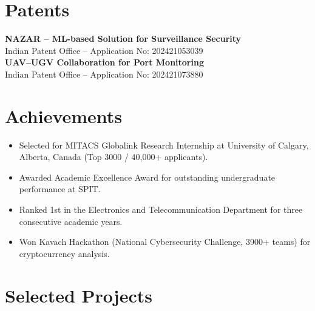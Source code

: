 \documentclass[a4paper,10pt]{article}
\begin{document}
\section*{Patents}
\textbf{NAZAR – ML-based Solution for Surveillance Security}\\
Indian Patent Office – Application No: 202421053039\\[0.2em]
\textbf{UAV–UGV Collaboration for Port Monitoring}\\
Indian Patent Office – Application No: 202421073880


\section*{Achievements}
\begin{itemize}
    \item Selected for MITACS Globalink Research Internship at University of Calgary, Alberta, Canada (Top 3000 / 40,000+ applicants).
    \item Awarded Academic Excellence Award for outstanding undergraduate performance at SPIT.
    \item Ranked 1st in the Electronics and Telecommunication Department for three consecutive academic years.
    \item Won Kavach Hackathon (National Cybersecurity Challenge, 3900+ teams) for cryptocurrency analysis.
\end{itemize}


\section*{Selected Projects}
\end{document}
